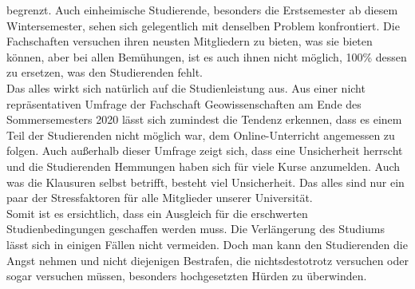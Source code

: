 {            begrenzt. Auch einheimische Studierende, besonders die Erstsemester ab diesem Wintersemester,
            sehen sich gelegentlich mit denselben Problem konfrontiert. Die Fachschaften versuchen ihren
            neusten Mitgliedern zu bieten, was sie bieten können, aber bei allen Bemühungen, ist es auch ihnen
            nicht möglich, 100\% dessen zu ersetzen, was den Studierenden fehlt.\\
            Das alles wirkt sich natürlich auf die Studienleistung aus. Aus einer nicht repräsentativen Umfrage
            der Fachschaft Geowissenschaften am Ende des Sommersemesters 2020 lässt sich zumindest die
            Tendenz erkennen, dass es einem Teil der Studierenden nicht möglich war, dem Online-Unterricht
            angemessen zu folgen. Auch außerhalb dieser Umfrage zeigt sich, dass eine Unsicherheit herrscht
            und die Studierenden Hemmungen haben sich für viele Kurse anzumelden. Auch was die
            Klausuren selbst betrifft, besteht viel Unsicherheit. Das alles sind nur ein paar der Stressfaktoren
            für alle Mitglieder unserer Universität.\\
            Somit ist es ersichtlich, dass ein Ausgleich für die erschwerten Studienbedingungen geschaffen
            werden muss. Die Verlängerung des Studiums lässt sich in einigen Fällen nicht vermeiden. Doch
            man kann den Studierenden die Angst nehmen und nicht diejenigen Bestrafen, die nichtsdestotrotz
            versuchen oder sogar versuchen müssen, besonders hochgesetzten Hürden zu überwinden.
        }{

        }{
        }
